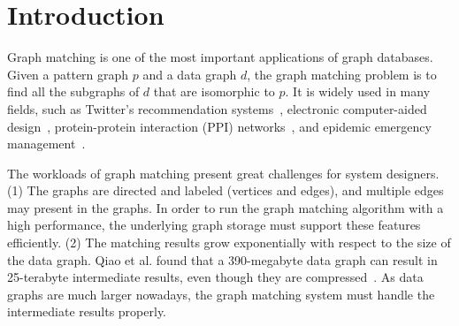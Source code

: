 \section{Introduction}
Graph matching is one of the most important applications of graph databases.
Given a pattern graph $p$ and a data graph $d$, the graph matching problem is to find all the subgraphs of $d$ that are isomorphic to $p$.
It is widely used in many fields,
such as Twitter's recommendation systems~\cite{DBLP:journals/pvldb/GuptaSGGZLL14,DBLP:journals/pvldb/SharmaJBLL16},
electronic computer-aided design~\cite{DBLP:conf/dac/OhlrichEGS93},
protein-protein interaction (PPI) networks~\cite{milenkovic2008uncovering},
and epidemic emergency management~\cite{info:doi/10.2196/26836}.

The workloads of graph matching present great challenges for system designers.
(1) The graphs are directed and labeled (vertices and edges), and multiple edges may present in the graphs.
In order to run the graph matching algorithm with a high performance, the underlying graph storage must support these features efficiently.
(2) The matching results grow exponentially with respect to the size of the data graph.
Qiao et al. found that a 390-megabyte data graph can result in 25-terabyte intermediate results, even though they are compressed~\cite{DBLP:journals/pvldb/QiaoZC17}.
As data graphs are much larger nowadays, the graph matching system must handle the intermediate results properly.
